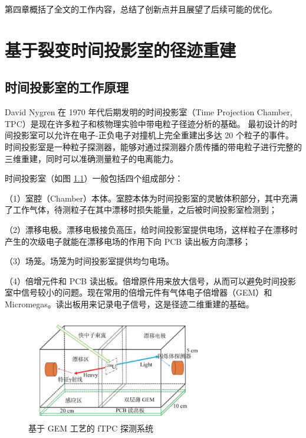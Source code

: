 \documentclass[AutoFakeBold]{LZUThesis}
\begin{document}
第四章概括了全文的工作内容，总结了创新点并且展望了后续可能的优化。








\chapter{基于裂变时间投影室的径迹重建}
\section{时间投影室的工作原理}
David Nygren 在 1970 年代后期发明的时间投影室（Time Projection Chamber, TPC）是现在许多粒子和核物理实验中带电粒子径迹分析的基础\cite{nygren1978time}。
最初设计的时间投影室可以允许在电子-正负电子对撞机上完全重建出多达 20 个粒子的事件。
时间投影室是一种粒子探测器，能够对通过探测器介质传播的带电粒子进行完整的三维重建，同时可以准确测量粒子的电离能力。

时间投影室（如图 \ref{fig_GEM-TPC}）一般包括四个组成部分\cite{闫洋洋2018用于高精度裂变截面测量的时间投影室, 魏康2019基于GEM工艺的裂变时间投影室中裂变碎片的讨论}：

（1）室腔（Chamber）本体。室腔本体为时间投影室的灵敏体积部分，其中充满了工作气体，待测粒子在其中漂移时损失能量，之后被时间投影室检测到；

（2）漂移电极。漂移电极接负高压，给时间投影室提供电场，这样粒子在漂移时产生的次级电子就能在漂移电场的作用下向 PCB 读出板方向漂移；

（3）场笼。场笼为时间投影室提供均匀电场。

（4）倍增元件和 PCB 读出板。倍增原件用来放大信号，从而可以避免时间投影室中信号较小的问题。现在常用的倍增元件有气体电子倍增器（GEM）和 Micromegas。读出板用来记录电子信号，这是径迹二维重建的基础。

\begin{figure}[H]
    \centering
    \includegraphics[width=0.7\textwidth]{figures/GEM-TPC.png}
    \caption{基于 GEM 工艺的 fTPC 探测系统\cite{魏康2019基于GEM工艺的裂变时间投影室中裂变碎片的讨论}}
    \label{fig_GEM-TPC}
\end{figure}
\end{document}
